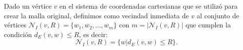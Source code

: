 \begin{definition}
\label{def-neighbourhood-template}
Dado un v\'ertice $v$ en el sistema de coordenadas cartesianas que se utiliz\'o para crear la malla original, definimos como vecindad inmediata de $v$ al conjunto de v\'ertices $\mathcal{N}_I(v,R) = \lbrace w_1, w_2, \ldots, w_m \rbrace$ con $m=|\mathcal{N}_I(v,R)|$ que cumplen la condici\'on $d_E(v,w) \leq R$, es decir:
\begin{equation}
\mathcal{N}_I(v,R) = \lbrace w | d_E(v,w) \leq R \rbrace.
\end{equation}
\end{definition} 

\begin{figure}[!ht]
\begin{center}

\end{center}
\end{figure}
